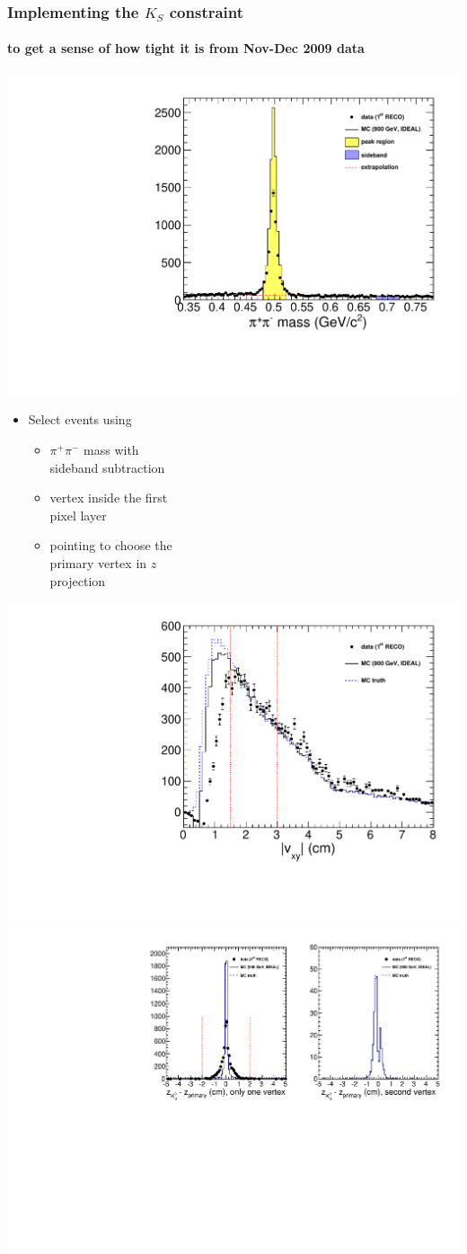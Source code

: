 \documentclass[compress]{beamer}
\begin{document}
\begin{frame}
\frametitle{Implementing the $K_S$ constraint}
\framesubtitle{to get a sense of how tight it is from Nov-Dec 2009 data}

\hfill \includegraphics[width=0.5\linewidth]{kaonTracking2_masspeak.pdf}

\vspace{-4.3 cm}
\begin{itemize}
\item Select events using
\begin{itemize}
\item $\pi^+\pi^-$ mass with \\ sideband subtraction
\item vertex inside the first \\ pixel layer
\item pointing to choose the \\ primary vertex in $z$ \\ projection
\end{itemize}
\end{itemize}

\includegraphics[height=3.5 cm]{kaonTracking2_vxy.pdf}
\includegraphics[height=3.5 cm]{kaonTracking2_zcut.pdf}
\end{frame}
\end{document}
